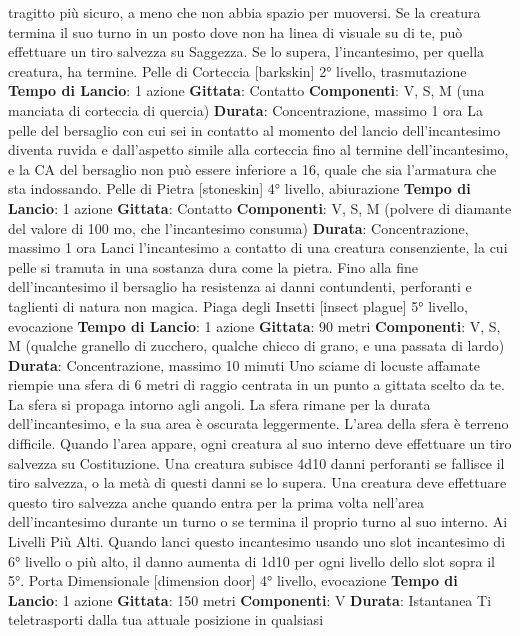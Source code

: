 \begin{multicols}{2}
tragitto più sicuro, a meno che non abbia spazio per
muoversi. Se la creatura termina il suo turno in un posto
dove non ha linea di visuale su di te, può effettuare un
tiro salvezza su Saggezza. Se lo supera, l’incantesimo,
per quella creatura, ha termine.
Pelle di Corteccia
[barkskin]
2° livello, trasmutazione
\textbf{Tempo di Lancio}: 1 azione
\textbf{Gittata}: Contatto
\textbf{Componenti}: V, S, M (una manciata di corteccia di
quercia)
\textbf{Durata}: Concentrazione, massimo 1 ora
La pelle del bersaglio con cui sei in contatto al
momento del lancio dell’incantesimo diventa ruvida e
dall’aspetto simile alla corteccia fino al termine
dell’incantesimo, e la CA del bersaglio non può essere
inferiore a 16, quale che sia l’armatura che sta
indossando.
Pelle di Pietra
[stoneskin]
4° livello, abiurazione
\textbf{Tempo di Lancio}: 1 azione
\textbf{Gittata}: Contatto
\textbf{Componenti}: V, S, M (polvere di diamante del valore di
100 mo, che l’incantesimo consuma)
\textbf{Durata}: Concentrazione, massimo 1 ora
Lanci l’incantesimo a contatto di una creatura
consenziente, la cui pelle si tramuta in una sostanza
dura come la pietra. Fino alla fine dell’incantesimo il
bersaglio ha resistenza ai danni contundenti, perforanti
e taglienti di natura non magica.
Piaga degli Insetti
[insect plague]
5° livello, evocazione
\textbf{Tempo di Lancio}: 1 azione
\textbf{Gittata}: 90 metri
\textbf{Componenti}: V, S, M (qualche granello di zucchero,
qualche chicco di grano, e una passata di lardo)
\textbf{Durata}: Concentrazione, massimo 10 minuti
Uno sciame di locuste affamate riempie una sfera di 6
metri di raggio centrata in un punto a gittata scelto da
te. La sfera si propaga intorno agli angoli. La sfera
rimane per la durata dell’incantesimo, e la sua area è
oscurata leggermente. L’area della sfera è terreno
difficile.
Quando l’area appare, ogni creatura al suo interno deve
effettuare un tiro salvezza su Costituzione. Una
creatura subisce 4d10 danni perforanti se fallisce il tiro
salvezza, o la metà di questi danni se lo supera. Una
creatura deve effettuare questo tiro salvezza anche
quando entra per la prima volta nell’area
dell’incantesimo durante un turno o se termina il proprio
turno al suo interno.
Ai Livelli Più Alti. Quando lanci questo incantesimo
usando uno slot incantesimo di 6° livello o più alto, il
danno aumenta di 1d10 per ogni livello dello slot sopra
il 5°.
Porta Dimensionale
[dimension door]
4° livello, evocazione
\textbf{Tempo di Lancio}: 1 azione
\textbf{Gittata}: 150 metri
\textbf{Componenti}: V
\textbf{Durata}: Istantanea
Ti teletrasporti dalla tua attuale posizione in qualsiasi

\end{multicols}
